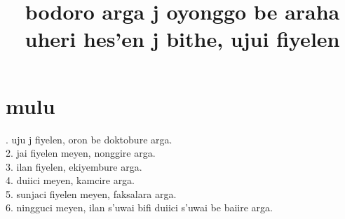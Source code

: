 \documentclass{report}
\title{bodoro arga j oyonggo be araha uheri hes'en j bithe, ujui fiyelen}
\begin{document}
\maketitle
\chapter{mulu}%
. uju j fiyelen, oron be doktobure arga.\\
2. jai fiyelen meyen, nonggire arga.\\
3. ilan fiyelen, ekiyembure arga.\\
4. duiici meyen, kamcire arga.\\
5. sunjaci fiyelen meyen, faksalara arga.\\
6. ningguci meyen, ilan s'uwai bifi duiici s'uwai be baiire arga.\\

\end{document}
